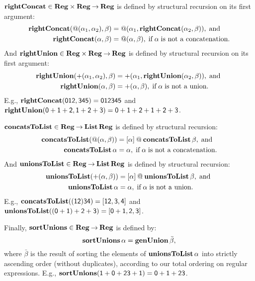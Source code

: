 $\mathbf{rightConcat}\in\mathbf{Reg}\times\mathbf{Reg}\mathbin{\to}\mathbf{Reg}$ is defined by
structural recursion on its first argument:
\begin{align*}
\mathbf{rightConcat}({@}(\alpha_1, \alpha_2), \beta) &=
{@}(\alpha_1, \mathbf{rightConcat}(\alpha_2, \beta)) , \;\allowbreak\mbox{and}\allowbreak\;\\
\mathbf{rightConcat}(\alpha, \beta) &= {@}(\alpha, \beta),
\;\allowbreak\mbox{if}\allowbreak\; \alpha \;\allowbreak\mbox{is not a concatenation}\allowbreak.
\end{align*}
And $\mathbf{rightUnion}\in\mathbf{Reg}\times\mathbf{Reg}\mathbin{\to}\mathbf{Reg}$ is defined by
structural recursion on its first argument:
\begin{align*}
\mathbf{rightUnion}({+}(\alpha_1, \alpha_2), \beta) &=
{+}(\alpha_1, \mathbf{rightUnion}(\alpha_2, \beta)) , \;\allowbreak\mbox{and}\allowbreak\; \\
\mathbf{rightUnion}(\alpha, \beta) &= {+}(\alpha, \beta),
\;\allowbreak\mbox{if}\allowbreak\; \alpha \;\allowbreak\mbox{is not a union}\allowbreak.
\end{align*}
E.g., $\mathbf{rightConcat}(\mathsf{012}, \mathsf{345}) =
\mathsf{012345}$ and $\mathbf{rightUnion}(\mathsf{0 + 1 + 2}, \mathsf{1 + 2 + 3}) =
\mathsf{0 + 1 + 2 + 1 + 2 + 3}$.

$\mathbf{concatsToList}\in\mathbf{Reg}\mathbin{\to}\mathbf{List}\,\mathbf{Reg}$ is defined by structural
recursion:
\begin{align*}
\mathbf{concatsToList}({@}(\alpha, \beta)) &=
[\alpha] \mathbin{@} \mathbf{concatsToList}\,\beta, \;\allowbreak\mbox{and}\allowbreak\; \\
\mathbf{concatsToList}\,\alpha &= \alpha,
\;\allowbreak\mbox{if}\allowbreak\; \alpha \;\allowbreak\mbox{is not a concatenation}\allowbreak.
\end{align*}
And $\mathbf{unionsToList}\in\mathbf{Reg}\mathbin{\to}\mathbf{List}\,\mathbf{Reg}$ is defined by structural
recursion:
\begin{align*}
\mathbf{unionsToList}({+}(\alpha, \beta)) &=
[\alpha] \mathbin{@} \mathbf{unionsToList}\,\beta, \;\allowbreak\mbox{and}\allowbreak\; \\
\mathbf{unionsToList}\,\alpha &= \alpha,
\;\allowbreak\mbox{if}\allowbreak\; \alpha \;\allowbreak\mbox{is not a union}\allowbreak.
\end{align*}
E.g., $\mathbf{concatsToList}(\mathsf{(12)34}) = [\mathsf{12, 3, 4}]$
and $\mathbf{unionsToList}(\mathsf{(0+1)+2+3}) = [\mathsf{0 + 1, 2, 3}]$.

Finally, $\mathbf{sortUnions}\in\mathbf{Reg}\mathbin{\to}\mathbf{Reg}$ is defined by:
\begin{displaymath}
\mathbf{sortUnions}\,\alpha = \mathbf{genUnion}\,\bar{\beta} ,
\end{displaymath}
where $\bar{\beta}$ is the result of sorting the elements of
$\mathbf{unionsToList}\,\alpha$ into strictly ascending order (without
duplicates), according to our total ordering on regular expressions.
E.g., $\mathbf{sortUnions}(\mathsf{1 + 0 + 23 + 1}) = \mathsf{0 + 1 + 23}$.

